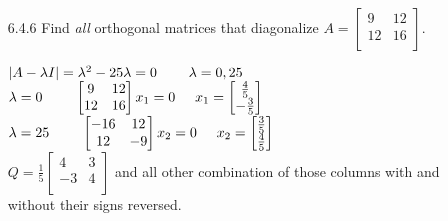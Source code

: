 \documentclass[10pt,twoside,reqno]{article}
\begin{document}
\begin{enumerate}
\vspace{3mm}
\item[6.4.6] Find \textit{all} orthogonal matrices that diagonalize $A = 
\begin{bmatrix}
9&12\\
12&16\\
\end{bmatrix}$. \\ \vspace{2mm}
\begin{center}
$
|A-\lambda I| = \lambda^2-25\lambda=0 \hspace{8mm} \lambda=0,25
$ \\
$
\lambda = 0 \hspace{8mm}
\begin{bmatrix}
9&12\\
12&16\\
\end{bmatrix}
x_1=0
\hspace{5mm}
x_1 = 
\begin{bmatrix}
\frac{4}{5}\\
-\frac{3}{5}\\
\end{bmatrix}
$ \\
$
\lambda = 25 \hspace{8mm}
\begin{bmatrix}
-16&12\\
12&-9\\
\end{bmatrix}
x_2=0
\hspace{5mm}
x_2 = 
\begin{bmatrix}
\frac{3}{5}\\
\frac{4}{5}\\
\end{bmatrix}
$ \\
$
Q=
\frac{1}{5}
\begin{bmatrix}
4&3\\
-3&4\\
\end{bmatrix}
$ and all other combination of those columns with and without their signs reversed. \\
\end{center}


\end{enumerate}
\end{document}
